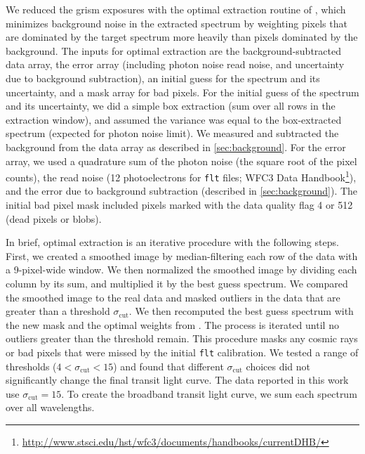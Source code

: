 \documentclass[twocolumn]{aastex62}
\begin{document}
We reduced the grism exposures with the optimal extraction routine of \cite{horne86}, which minimizes background noise in the extracted spectrum by weighting pixels that are dominated by the target spectrum more heavily than pixels dominated by the background.  The inputs for optimal extraction are the background-subtracted data array, the error array (including photon noise read noise, and uncertainty due to background subtraction), an initial guess for the spectrum and its uncertainty, and a mask array for bad pixels.  For the initial guess of the spectrum and its uncertainty, we did a simple box extraction (sum over all rows in the extraction window), and assumed the variance was equal to the box-extracted spectrum (expected for photon noise limit).  We measured and subtracted the background from the data array as described in \ref{sec:background}. For the error array, we used a quadrature sum of the photon noise (the square root of the pixel counts), the read noise (12 photoelectrons for \texttt{flt} files; WFC3 Data Handbook\footnote{\url{http://www.stsci.edu/hst/wfc3/documents/handbooks/currentDHB/}}), and the error due to background subtraction (described in \ref{sec:background}).  The initial bad pixel mask included pixels marked with the data quality flag 4 or 512 (dead pixels or blobs). 

In brief, optimal extraction is an iterative procedure with the following steps. First, we created a smoothed image by median-filtering each row of the data with a 9-pixel-wide window.  We then normalized the smoothed image by dividing each column by its sum, and multiplied it by the best guess spectrum. We compared the smoothed image to the real data and masked outliers in the data that are greater than a threshold $\sigma_\mathrm{cut}$. We then recomputed the best guess spectrum with the new mask and the optimal weights from \cite{horne86}. The process is iterated until no outliers greater than the threshold remain.  This procedure masks any cosmic rays or bad pixels that were missed by the initial \texttt{flt} calibration.  We tested a range of thresholds ($4 < \sigma_\mathrm{cut} < 15$) and found that different $\sigma_\mathrm{cut}$ choices did not significantly change the final transit light curve. The data reported in this work use $\sigma_\mathrm{cut} = 15$.  To create the broadband transit light curve, we sum each spectrum over all wavelengths. 


\end{document}
